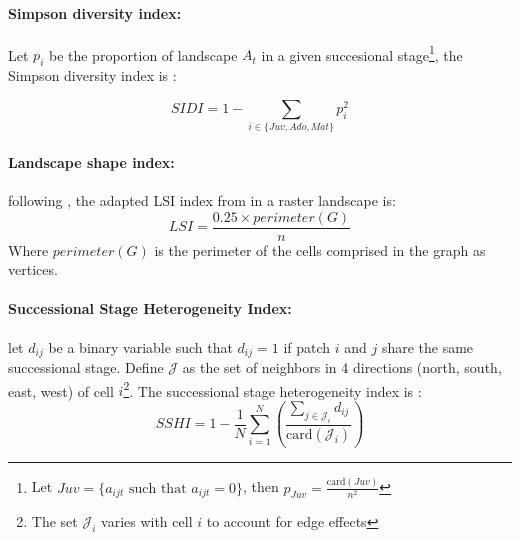 

\paragraph{Simpson diversity index:}
Let $p_i$ be the proportion of landscape $A_t$ in a given succesional stage\footnote{Let $Juv = \{a_{ijt} \text{ such that } a_{ijt}=0\}$, then $p_{Juv} = \frac{\mathrm{card}(Juv)}{n^2}$}, the Simpson diversity index is : 

\begin{equation}
SIDI = 1 - \sum_{i \in \{Juv, Ado, Mat\}} p_i^2
    \label{eq:simpson}
\end{equation}


\paragraph{Landscape shape index:}
following \cite{McGarigal_1995}, the adapted LSI index from \cite{patton_diversity_1975} in a raster landscape is:
\begin{equation}
    LSI = \frac{0.25\times perimeter(G)}{n}
    \label{eq:LSI}
\end{equation}
Where $perimeter(G)$ is the perimeter of the cells comprised in the graph as vertices.

\paragraph{Successional Stage Heterogeneity Index:} let $d_{ij}$ be a binary variable such that $d_{ij}=1$ if patch $i$ and $j$ share the same successional stage. Define $\mathcal{J}$ as the set of neighbors in 4 directions (north, south, east, west) of cell $i$\footnote{The set $\mathcal{J}_i$ varies with cell $i$ to account for edge effects}.
The successional stage heterogeneity index is : 
\begin{equation}
    SSHI = 1 - \frac{1}{N}\sum_{i=1}^N\left( \frac{\sum_{j \in \mathcal{J}_i} d_{ij}}{\mathrm{card}(\mathcal{J}_i)}\right)
\end{equation}
\label{eq:lth_index}


